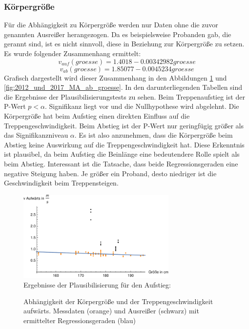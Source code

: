 \subsubsection{Körpergröße}
Für die Abhängigkeit zu Körpergröße werden nur Daten ohne die zuvor genannten Ausreißer herangezogen. Da es beispielsweise Probanden gab, die gerannt sind, ist es nicht sinnvoll, diese in Beziehung zur Körpergröße zu setzen. Es wurde folgender Zusammenhang ermittelt:
\begin{equation}
v_{auf}(groesse) = 1.4018 -0.00342982 groesse
\label{eq:2012_2017_AufGroesse_MA}
\end{equation}
\begin{equation}
v_{ab}(groesse) = 1.85077 -0.0045234 groesse
\label{eq:2012_2017_AbGroesse_MA}
\end{equation}
Grafisch dargestellt wird dieser Zusammenhang in den Abbildungen \ref{fig:2012_und_2017_MA_auf_groesse} und \ref{fig:2012_und_2017_MA_ab_groesse}. In den darunterliegenden Tabellen sind die Ergebnisse der Plausibilisierungstests zu sehen. Beim Treppenaufstieg ist der P-Wert $p<\alpha$. Signifikanz liegt vor und die Nullhypothese wird abgelehnt. Die Körpergröße hat beim Aufstieg einen direkten Einfluss auf die Treppengeschwindigkeit. Beim Abstieg ist der P-Wert nur geringfügig größer als das Signifikanzniveau $\alpha$. Es ist also anzunehmen, dass die Körpergröße beim Abstieg keine Auswirkung auf die Treppengeschwindigkeit hat. Diese Erkenntnis ist plausibel, da beim Aufstieg die Beinlänge eine bedeutendere Rolle spielt als beim Abstieg. Interessant ist die  Tatsache, dass beide Regressionsgeraden eine negative Steigung haben. Je größer ein Proband, desto niedriger ist die Geschwindigkeit beim Treppensteigen.

\begin{figure}[htpb]
\centering
\includegraphics[width=0.7\textwidth]{abbildungen/regression/2012_2017_verbund/ohneausreisser/auf-groesse.pdf}
\justify \ \\
Ergebnisse der Plausibilisierung für den Aufstieg:

\caption{Abhängigkeit der Körpergröße und der Treppengeschwindigkeit aufwärts. Messdaten (orange) und Ausreißer (schwarz) mit ermittelter Regressionsgeraden (blau)}
\label{fig:2012_und_2017_MA_auf_groesse}
\end{figure}



